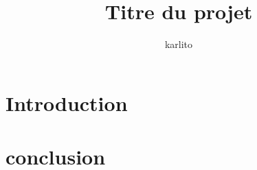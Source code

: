 \documentclass[remplissage]{karlito}
\title{Titre du projet}
\author{karlito}
\begin{document}
\maketitle
\sommaire


\chapter{Introduction}





\chapter{conclusion}



\tabledesfigures
\appendix
\end{document}
